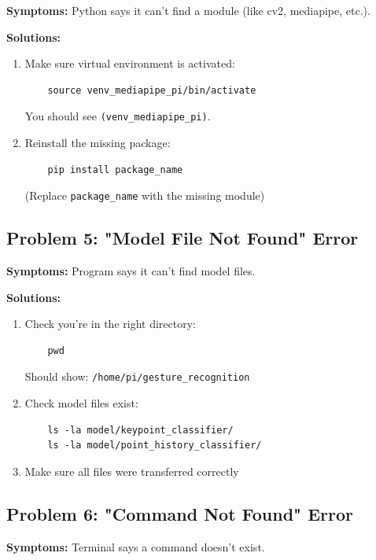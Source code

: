 \documentclass[12pt,a4paper]{article}
\begin{document}
\textbf{Symptoms:} Python says it can't find a module (like cv2, mediapipe, etc.).

\textbf{Solutions:}

\begin{enumerate}
    \item Make sure virtual environment is activated:
    \begin{lstlisting}
    source venv_mediapipe_pi/bin/activate
    \end{lstlisting}
    You should see \texttt{(venv\_mediapipe\_pi)}.
    
    \item Reinstall the missing package:
    \begin{lstlisting}
    pip install package_name
    \end{lstlisting}
    (Replace \texttt{package\_name} with the missing module)
\end{enumerate}

\subsection{Problem 5: "Model File Not Found" Error}

\textbf{Symptoms:} Program says it can't find model files.

\textbf{Solutions:}

\begin{enumerate}
    \item Check you're in the right directory:
    \begin{lstlisting}
    pwd
    \end{lstlisting}
    Should show: \texttt{/home/pi/gesture\_recognition}
    
    \item Check model files exist:
    \begin{lstlisting}
    ls -la model/keypoint_classifier/
    ls -la model/point_history_classifier/
    \end{lstlisting}
    
    \item Make sure all files were transferred correctly
\end{enumerate}

\subsection{Problem 6: "Command Not Found" Error}

\textbf{Symptoms:} Terminal says a command doesn't exist.
\end{document}

